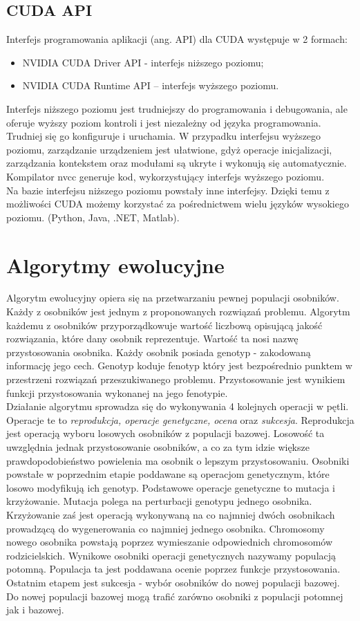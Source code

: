 \documentclass[12pt,a4paper]{article}
\begin{document}
\subsection{CUDA API}
Interfejs programowania aplikacji (ang. API) dla CUDA występuje w 2 formach:
\begin{itemize}
\item NVIDIA CUDA Driver API	 - interfejs niższego poziomu;
\item NVIDIA CUDA Runtime API – interfejs wyższego poziomu.
\end{itemize}
Interfejs niższego poziomu jest trudniejszy do programowania i debugowania, ale oferuje wyższy poziom kontroli i jest niezależny od języka programowania. Trudniej się go konfiguruje i uruchamia. 
W przypadku interfejsu wyższego poziomu, zarządzanie urządzeniem jest ułatwione, gdyż operacje inicjalizacji, zarządzania kontekstem oraz modułami są ukryte i wykonują się automatycznie. Kompilator nvcc generuje kod, wykorzystujący interfejs wyższego poziomu. 
\\\indent Na bazie interfejsu niższego poziomu powstały inne interfejsy. Dzięki temu z możliwości CUDA możemy korzystać za pośrednictwem wielu języków wysokiego poziomu. (Python, Java, .NET, Matlab).
\newpage
\section{Algorytmy ewolucyjne}
\indent Algorytm ewolucyjny opiera się na przetwarzaniu pewnej populacji osobników. Każdy z osobników jest jednym z proponowanych rozwiązań problemu. Algorytm każdemu z osobników przyporządkowuje wartość liczbową opisującą jakość rozwiązania, które dany osobnik reprezentuje. Wartość ta nosi nazwę przystosowania osobnika. Każdy osobnik posiada genotyp - zakodowaną informację jego cech. Genotyp koduje fenotyp który jest bezpośrednio punktem w przestrzeni rozwiązań przeszukiwanego problemu. Przystosowanie jest wynikiem funkcji przystosowania wykonanej na jego fenotypie.\\
\indent Działanie algorytmu sprowadza się do wykonywania 4 kolejnych operacji w pętli. Operacje te to \textit{reprodukcja, operacje genetyczne, ocena} oraz \textit{sukcesja}. Reprodukcja jest operacją wyboru losowych osobników z populacji bazowej. Losowość ta uwzględnia jednak przystosowanie osobników, a co za tym idzie większe prawdopodobieństwo powielenia ma osobnik o lepszym przystosowaniu. Osobniki powstałe w poprzednim etapie poddawane są operacjom genetycznym, które losowo modyfikują ich genotyp. Podstawowe operacje genetyczne to mutacja i krzyżowanie. Mutacja polega na perturbacji genotypu jednego osobnika. Krzyżowanie zaś jest operacją wykonywaną na co najmniej dwóch osobnikach prowadzącą do wygenerowania co najmniej jednego osobnika. Chromosomy nowego osobnika powstają poprzez wymieszanie odpowiednich chromosomów rodzicielskich. Wynikowe osobniki operacji genetycznych nazywamy populacją potomną. Populacja ta jest poddawana ocenie poprzez funkcje przystosowania. Ostatnim etapem jest sukcesja - wybór osobników do nowej populacji bazowej. Do nowej populacji bazowej mogą trafić zarówno osobniki z populacji potomnej jak i bazowej. 
\end{document}
